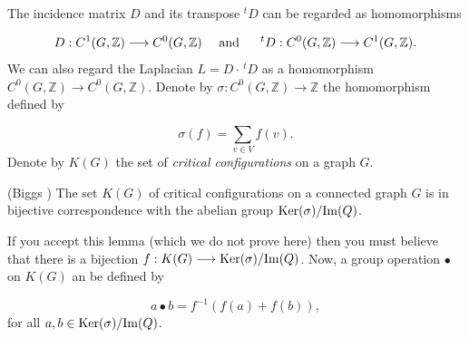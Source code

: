 The
incidence matrix $D$ and its transpose $^tD$ can be regarded as
homomorphisms

\[
D : C^1(G,{\mathbb{Z}})\to C^0(G,{\mathbb{Z}}) \ \ \ \ {\rm and}\ \ \ \ \ 
^tD : C^0(G,{\mathbb{Z}})\to C^1(G,{\mathbb{Z}}).
\]
We can also regard the Laplacian $L = D\cdot \, ^tD$ as a homomorphism 
\index{Laplacian}
$C^0(G,{\mathbb{Z}})\to C^0(G,{\mathbb{Z}})$. Denote by
$\sigma : C^0(G,{\mathbb{Z}})\to {\mathbb{Z}}$ the homomorphism defined by 

\[
\sigma(f) = \sum_{v\in V} f(v).
\]
Denote by $K(G)$ the set of {\it critical configurations} 
on a graph $G$.

\begin{lemma} (Biggs \cite{Biggs2007})
{\rm
The set $K(G)$ of critical configurations on a connected graph $G$ is in
bijective correspondence with the abelian group 
${\rm Ker} (\sigma)/{\rm Im}( Q)$.
}
\end{lemma}

If you accept this lemma (which we do not prove here) then
you must believe that there is a bijection
$f:K(G)\to {\rm Ker} (\sigma)/{\rm Im}( Q)$. Now, a group
operation $\bullet $ on $K(G)$ an be defined by

\[
a\bullet b = f^{-1}(f(a)+f(b)),
\]
for all $a,b\in {\rm Ker} (\sigma)/{\rm Im}( Q)$.

